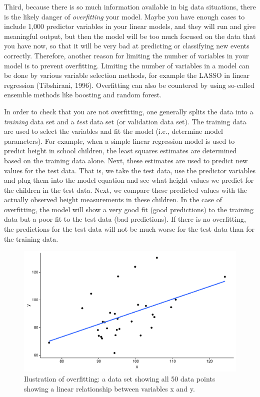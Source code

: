 \documentclass[]{book}\usepackage[]{graphicx}\usepackage[]{color}
\makeatletter
\def\maxwidth{ %
  \ifdim\Gin@nat@width>\linewidth
    \linewidth
  \else
    \Gin@nat@width
  \fi
}
\newenvironment{knitrout}{}{} %
\makeatother
\begin{document}
Third, because there is so much information available in big data situations, there is the likely danger of \textit{overfitting} your model. Maybe you have enough cases to include 1,000 predictor variables in your linear models, and they will run and give meaningful output, but then the model will be too much focused on the data that you have now, so that it will be very bad at predicting or classifying new events correctly. Therefore, another reason for limiting the number of variables in your model is to prevent overfitting. Limiting the number of variables in a model can be done by various variable selection methods, for example the LASSO in linear regression (Tibshirani, 1996). Overfitting can also be countered by using so-called ensemble methods like boosting and random forest. 


In order to check that you are not overfitting, one generally splits the data into a \textit{training} data set and a \textit{test} data set (or validation data set). The training data are used to select the variables and fit the model (i.e., determine model parameters). For example, when a simple linear regression model is used to predict height in school children, the least squares estimates are determined based on the training data alone. Next, these estimates are used to predict new values for the test data. That is, we take the test data, use the predictor variables and plug them into the model equation and see what height values we predict for the children in the test data. Next, we compare these predicted values with the actually observed height measurements in these children. In the case of overfitting, the model will show a very good fit (good predictions) to the training data but a poor fit to the test data (bad predictions). If there is no overfitting, the predictions for the test data will not be much worse for the test data than for the training data.


\begin{knitrout}
\color{fgcolor}\begin{figure}
\includegraphics[width=\maxwidth]{figure/overfitting_complete-1} \caption[Ilustration of overfitting]{Ilustration of overfitting: a data set showing all 50 data points showing a linear relationship between variables x and y.}\label{fig:overfitting_complete}
\end{figure}


\end{knitrout}
\end{document}
